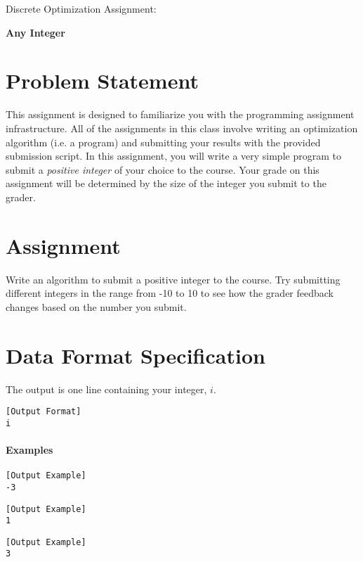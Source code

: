 \documentclass[11pt]{article}
\begin{document}
\huge
\noindent
{Discrete Optimization Assignment:}
\vspace{0.25cm}

\noindent
{\bf Any Integer}
\normalsize


\section{Problem Statement}
This assignment is designed to familiarize you with the programming assignment infrastructure.  All of the assignments in this class involve writing an optimization algorithm (i.e. a program) and submitting your results with the provided submission script.  In this assignment, you will write a very simple program to submit a {\em positive integer} of your choice to the course.  Your grade on this assignment will be determined by the size of the integer you submit to the grader. 

\section{Assignment}

Write an algorithm to submit a positive integer to the course.  Try submitting different integers in the range from -10 to 10 to see how the grader feedback changes based on the number you submit.

\section{Data Format Specification}

The output is one line containing your integer, $i$.
%
\begin{verbatim}[Output Format]
i
\end{verbatim}
%

\paragraph{Examples}

\begin{verbatim}[Output Example]
-3
\end{verbatim}

\begin{verbatim}[Output Example]
1
\end{verbatim}

\begin{verbatim}[Output Example]
3
\end{verbatim}
\end{document}

